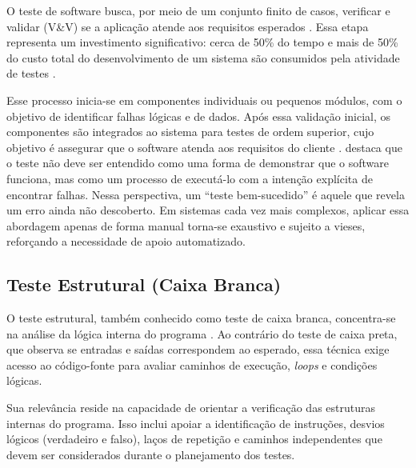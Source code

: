 O teste de software busca, por meio de um conjunto finito de casos, verificar e validar (V\&V) se a aplicação atende aos requisitos esperados \cite{Valente2020}. Essa etapa representa um investimento significativo: cerca de 50\% do tempo e mais de 50\% do custo total do desenvolvimento de um sistema são consumidos pela atividade de testes \cite{Myers2014}.

Esse processo inicia-se em componentes individuais ou pequenos módulos, com o objetivo de identificar falhas lógicas e de dados. Após essa validação inicial, os componentes são integrados ao sistema para testes de ordem superior, cujo objetivo é assegurar que o software atenda aos requisitos do cliente .  destaca que o teste não deve ser entendido como uma forma de demonstrar que o software funciona, mas como um processo de executá-lo com a intenção explícita de encontrar falhas. Nessa perspectiva, um ``teste bem-sucedido'' é aquele que revela um erro ainda não descoberto. Em sistemas cada vez mais complexos, aplicar essa abordagem apenas de forma manual torna-se exaustivo e sujeito a vieses, reforçando a necessidade de apoio automatizado.

\subsection{Teste Estrutural (Caixa Branca)}

O teste estrutural, também conhecido como teste de caixa branca, concentra-se na análise da lógica interna do programa \cite{Delamaro2013}. Ao contrário do teste de caixa preta, que observa se entradas e saídas correspondem ao esperado, essa técnica exige acesso ao código-fonte para avaliar caminhos de execução, \textit{loops} e condições lógicas.

Sua relevância reside na capacidade de orientar a verificação das estruturas internas do programa. Isso inclui apoiar a identificação de instruções, desvios lógicos (verdadeiro e falso), laços de repetição e caminhos independentes que devem ser considerados durante o planejamento dos testes.

